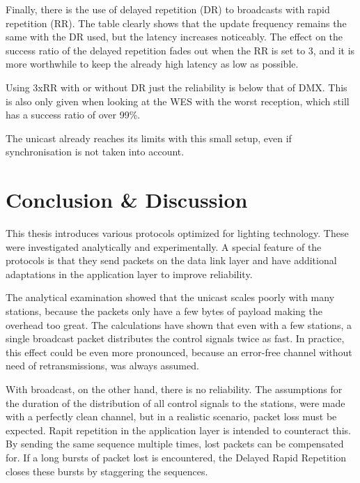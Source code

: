 Finally, there is the use of delayed repetition (DR) to broadcasts with rapid repetition (RR).
The table clearly shows that the update frequency remains the same with the DR used, but the latency increases noticeably.
The effect on the success ratio of the delayed repetition fades out when the RR is set to 3, 
and it is more worthwhile to keep the already high latency as low as possible.

Using 3xRR with or without DR just the reliability is below that of DMX.
This is also only given when looking at the WES with the worst reception, 
which still has a success ratio of over 99\%.

The unicast already reaches its limits with this small setup,
even if synchronisation is not taken into account.

\chapter{Conclusion \& Discussion}

This thesis introduces various protocols optimized for lighting technology.
These were investigated analytically and experimentally.
A special feature of the protocols is that they send packets on the data link layer
and have additional adaptations in the application layer to improve reliability.

The analytical examination showed that the unicast
scales poorly with many stations,
because the packets only have a few bytes of payload making the overhead too great.
The calculations have shown that even with a few stations, a single broadcast packet
distributes the control signals twice as fast.
In practice, this effect could be even more pronounced,
because an error-free channel without need of retransmissions, was always assumed.

With broadcast, on the other hand, there is no reliability.
The assumptions for the duration of the distribution of all control signals to the stations,
were made with a perfectly clean channel,
but in a realistic scenario, packet loss must be expected.
Rapit repetition in the application layer is intended to counteract this.
By sending the same sequence multiple times, lost packets can be compensated for.
If a long bursts of packet lost is encountered, 
the Delayed Rapid Repetition closes these bursts by staggering the sequences.

